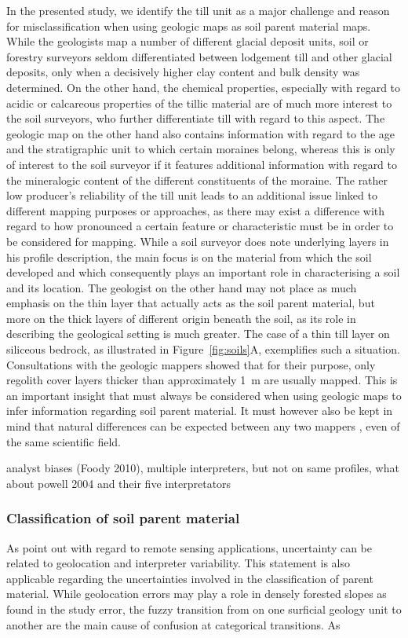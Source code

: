 \documentclass[preprint,12pt,authoryear]{elsarticle}
\begin{document}
In the presented study, we identify the till unit as a major challenge and reason for misclassification when using geologic maps as soil parent material maps. While the geologists map a number of different glacial deposit units, soil or forestry surveyors seldom differentiated between lodgement till and other glacial deposits, only when a decisively higher clay content and bulk density was determined. On the other hand, the chemical properties, especially with regard to acidic or calcareous properties of the tillic material are of much more interest to the soil surveyors, who further differentiate till with regard to this aspect. The geologic map on the other hand also contains information with regard to the age and the stratigraphic unit to which certain moraines belong, whereas this is only of interest to the soil surveyor if it features additional information with regard to the mineralogic content of the different constituents of the moraine. The rather low producer's reliability  of the till unit leads to an additional issue linked to different mapping purposes or approaches, as there may exist a difference with regard to how pronounced a certain feature or characteristic must be in order to be considered for mapping. While a soil surveyor does note underlying layers in his profile description, the main focus is on the material from which the soil developed and which consequently plays an important role in characterising a soil and its location. The geologist on the other hand may not place as much emphasis on the thin layer that actually acts as the soil parent material, but more on the thick layers of different origin beneath the soil, as its role in describing the geological setting is much greater. The case of a thin till layer on siliceous bedrock, as illustrated in Figure~\ref{fig:soils}A, exemplifies such a situation. Consultations with the geologic mappers showed that for their purpose, only regolith cover layers thicker than approximately 1~m are usually mapped. This is an important insight that must always be considered when using geologic maps to infer information regarding soil parent material. It must however also be kept in mind that natural differences can be expected between any two mappers \citep{Miller2015a}, even of the same scientific field. 

analyst biases (Foody 2010), multiple interpreters, but not on same profiles, what about powell 2004 and their five interpretators   
\subsubsection{Classification of soil parent material}
As \cite{Olofsson2013} point out with regard to remote sensing applications, uncertainty can be related to geolocation and interpreter  variability. This statement is also applicable regarding the uncertainties involved in the classification of parent material. While geolocation errors may play a role in densely forested slopes as found in the study error, the fuzzy transition from on one surficial geology unit to another are the main cause of confusion at categorical transitions. As \cite{Congalton1991}
\end{document}
